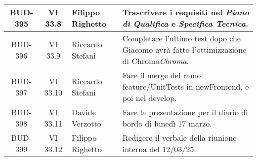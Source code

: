 \begin{table}[htbp]
\begin{tabular}{|c|c|p{}|p{}|}
    \hline
    BUD-395 & VI 33.8 & Filippo Righetto & Trascrivere i requisiti nel \emph{Piano di Qualifica} e \emph{Specifica Tecnica}. \\
    \hline
    BUD-396 & VI 33.9 & Riccardo Stefani & Completare l’ultimo test dopo che Giacomo avrà fatto l’ottimizzazione di Chroma\emph{Chroma}. \\
    \hline
    BUD-397 & VI 33.10 & Riccardo Stefani & Fare il merge del ramo feature/UnitTests in newFrontend, e poi nel develop. \\
    \hline
    BUD-398 & VI 33.11 & Davide Verzotto & Fare la presentazione per il diario di bordo di lunedì 17 marzo.  \\
    \hline
    BUD-399 & VI 33.12 & Filippo Righetto & Redigere il verbale della riunione interna del 12/03/25.  \\
    \hline
\end{tabular}
\end{table}
